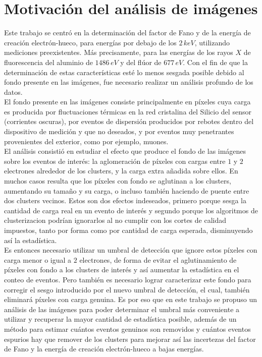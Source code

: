 \section{Motivación del análisis de imágenes}
\noindent Este trabajo se centró en la determinación del factor de Fano y de la energía de creación electrón-hueco, para energías por debajo de los $2\,\si{keV}$, utilizando mediciones preexistentes. Más precisamente, para las energías de los rayos $X$ de fluorescencia del aluminio de $1486\,\si{eV}$ y del flúor de $677\,\si{eV}$. Con el fin de que la determinación de estas características esté lo menos sesgada posible debido al fondo presente en las imágenes, fue necesario realizar un análisis profundo de los datos.\\
\indent El fondo presente en las imágenes consiste principalmente en píxeles cuya carga es producida por fluctuaciones térmicas en la red cristalina del Silicio del sensor (corrientes oscuras), por eventos de dispersión producidos por rebotes dentro del dispositivo de medición y que no deseados, y por eventos muy penetrantes provenientes del exterior, como por ejemplo, muones.\\
\indent El análisis consistió en estudiar el efecto que produce el fondo de las imágenes sobre los eventos de interés: la aglomeración de píxeles con cargas entre $1$ y $2$ electrones alrededor de los clusters, y la carga extra añadida sobre ellos. En muchos casos resulta que los píxeles con fondo se aglutinan a los clusters, aumentando su tamaño y su carga, o incluso también haciendo de puente entre dos clusters vecinos. Estos son dos efectos indeseados, primero porque sesga la cantidad de carga real en un evento de interés y segundo porque los algoritmos de clusterizacion podrían ignorarlos al no cumplir con los cortes de calidad impuestos, tanto por forma como por cantidad de carga esperada, disminuyendo así la estadística.\\
\indent Es entonces necesario utilizar un umbral de detección que ignore estos píxeles con carga menor o igual a $2$ electrones, de forma de evitar el aglutinamiento de píxeles con fondo a los clusters de interés y así aumentar la estadística en el conteo de eventos. Pero también es necesario lograr caracterizar este fondo para corregir el sesgo introducido por el nuevo umbral de detección, el cual, también eliminará píxeles con carga genuina. Es por eso que en este trabajo se propuso un análisis de las imágenes para poder determinar el umbral más conveniente a utilizar y recuperar la mayor cantidad de estadística posible, además de un método para estimar cuántos eventos genuinos son removidos y cuántos eventos espurios hay que remover de los clusters para mejorar así las incertezas del factor de Fano y la energía de creación electrón-hueco a bajas energías.

